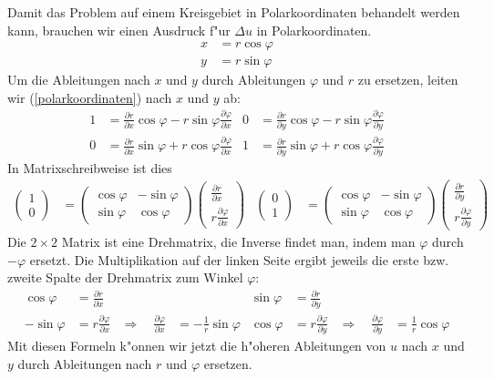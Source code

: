 Damit das Problem auf einem Kreisgebiet in Polarkoordinaten behandelt
werden kann,
brauchen wir einen Ausdruck f"ur $\Delta u$ in Polarkoordinaten.
\begin{align}
x&=r\cos\varphi\\
y&=r\sin\varphi
\label{polarkoordinaten}
\end{align}
Um die Ableitungen nach $x$ und $y$ durch Ableitungen $\varphi$ und $r$ zu
ersetzen, leiten wir (\ref{polarkoordinaten}) nach $x$ und $y$ ab:
\begin{align*}
1&=
\frac{\partial r}{\partial x}\cos\varphi
-r\sin\varphi \frac{\partial\varphi}{\partial x}
&
0&=
\frac{\partial r}{\partial y}\cos\varphi
-r\sin\varphi \frac{\partial\varphi}{\partial y}
\\
0&=
\frac{\partial r}{\partial x}\sin\varphi
+r\cos\varphi \frac{\partial\varphi}{\partial x}
&
1&=
\frac{\partial r}{\partial y}\sin\varphi
+r\cos\varphi \frac{\partial\varphi}{\partial y}
\end{align*}
In Matrixschreibweise ist dies
\begin{align*}
\begin{pmatrix}1\\0\end{pmatrix}
&=
\begin{pmatrix}
\cos\varphi&-\sin\varphi\\
\sin\varphi&\cos\varphi
\end{pmatrix}
\begin{pmatrix}
\frac{\partial r}{\partial x}\\
r\frac{\partial \varphi}{\partial x}
\end{pmatrix}
&
\begin{pmatrix}0\\1\end{pmatrix}
&=
\begin{pmatrix}
\cos\varphi&-\sin\varphi\\
\sin\varphi&\cos\varphi
\end{pmatrix}
\begin{pmatrix}
\frac{\partial r}{\partial y}\\
r\frac{\partial \varphi}{\partial y}
\end{pmatrix}
\end{align*}
Die $2\times2$ Matrix ist eine Drehmatrix, die Inverse findet man, indem man
$\varphi$ durch $-\varphi$ ersetzt. Die Multiplikation auf der linken Seite
ergibt jeweils die erste bzw. zweite Spalte der Drehmatrix zum
Winkel $\varphi$:
\begin{align*}
\cos\varphi
&=\frac{\partial r}{\partial x}
&&
&
\sin\varphi
&=
\frac{\partial r}{\partial y}
&&
\\
-\sin\varphi
&=r\frac{\partial \varphi}{\partial x}
&\Rightarrow\quad
\frac{\partial\varphi}{\partial x}&=-\frac1r\sin\varphi
&
\cos\varphi
&=
r\frac{\partial\varphi}{\partial y}
&\Rightarrow\quad
\frac{\partial\varphi}{\partial y}&=\frac1r\cos\varphi
\end{align*}
Mit diesen Formeln k"onnen wir jetzt die h"oheren Ableitungen
von $u$ nach  $x$ und $y$ durch Ableitungen nach $r$ und $\varphi$
ersetzen.

